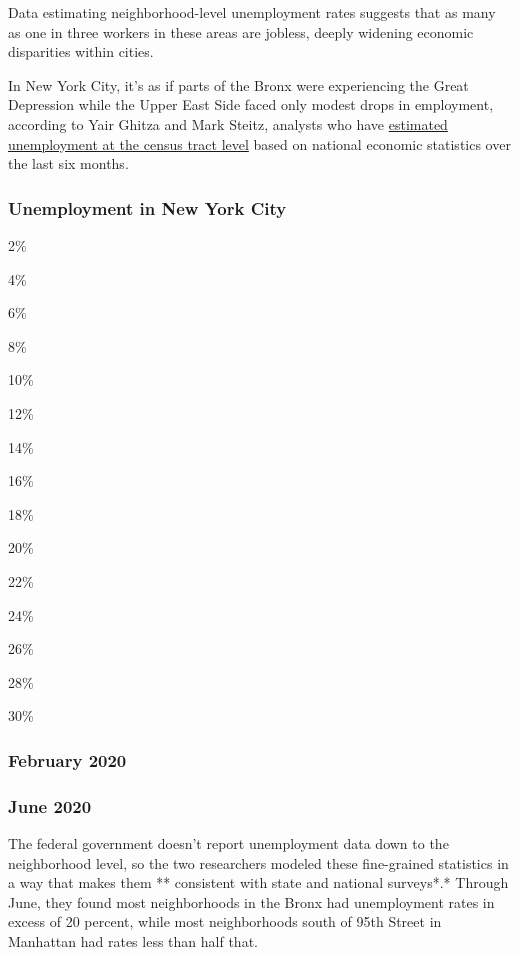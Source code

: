 Data estimating neighborhood-level unemployment rates suggests that as
many as one in three workers in these areas are jobless, deeply widening
economic disparities within cities.

In New York City, it's as if parts of the Bronx were experiencing the
Great Depression while the Upper East Side faced only modest drops in
employment, according to Yair Ghitza and Mark Steitz, analysts who have
\href{https://github.com/Catalist-LLC/unemployment/blob/master/deep_maps_20200804.pdf}{estimated
unemployment at the census tract level} based on national economic
statistics over the last six months.

\hypertarget{unemployment-in-new-york-city}{%
\subsubsection{Unemployment in New York
City}\label{unemployment-in-new-york-city}}

2\%

4\%

6\%

8\%

10\%

12\%

14\%

16\%

18\%

20\%

22\%

24\%

26\%

28\%

30\%

\hypertarget{february-2020}{%
\subsubsection{February 2020}\label{february-2020}}

\hypertarget{june-2020}{%
\subsubsection{June 2020}\label{june-2020}}

The federal government doesn't report unemployment data down to the
neighborhood level, so the two researchers modeled these fine-grained
statistics in a way that makes them ** consistent with state and
national surveys*.* Through June, they found most neighborhoods in the
Bronx had unemployment rates in excess of 20 percent, while most
neighborhoods south of 95th Street in Manhattan had rates less than half
that.

